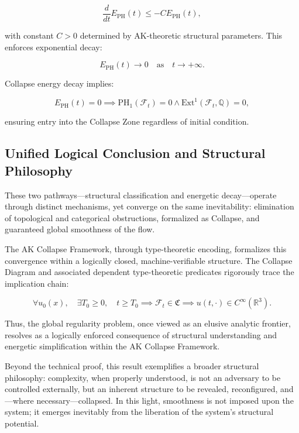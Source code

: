 \documentclass[11pt]{article}
\begin{document}
\begin{equation}
\frac{d}{dt} E_{\mathrm{PH}}(t) \leq -C E_{\mathrm{PH}}(t),
\end{equation}

with constant $C > 0$ determined by AK-theoretic structural parameters. This enforces exponential decay:

\begin{equation}
E_{\mathrm{PH}}(t) \to 0 \quad \text{as} \quad t \to +\infty.
\end{equation}

Collapse energy decay implies:

\begin{equation}
E_{\mathrm{PH}}(t) = 0 \implies \mathrm{PH}_1(\mathcal{F}_t) = 0 \land \mathrm{Ext}^1(\mathcal{F}_t, \mathbb{Q}) = 0,
\end{equation}

ensuring entry into the Collapse Zone regardless of initial condition.

\subsection{Unified Logical Conclusion and Structural Philosophy}

These two pathways---structural classification and energetic decay---operate through distinct mechanisms, yet converge on the same inevitability: elimination of topological and categorical obstructions, formalized as Collapse, and guaranteed global smoothness of the flow.

The AK Collapse Framework, through type-theoretic encoding, formalizes this convergence within a logically closed, machine-verifiable structure. The Collapse Diagram and associated dependent type-theoretic predicates rigorously trace the implication chain:

\begin{equation}
\forall u_0(x),\quad \exists T_0 \geq 0,\quad t \geq T_0 \implies \mathcal{F}_t \in \mathfrak{C} \implies u(t, \cdot) \in C^\infty(\mathbb{R}^3).
\end{equation}

Thus, the global regularity problem, once viewed as an elusive analytic frontier, resolves as a logically enforced consequence of structural understanding and energetic simplification within the AK Collapse Framework.

Beyond the technical proof, this result exemplifies a broader structural philosophy: complexity, when properly understood, is not an adversary to be controlled externally, but an inherent structure to be revealed, reconfigured, and---where necessary---collapsed. In this light, smoothness is not imposed upon the system; it emerges inevitably from the liberation of the system's structural potential.
\end{document}
